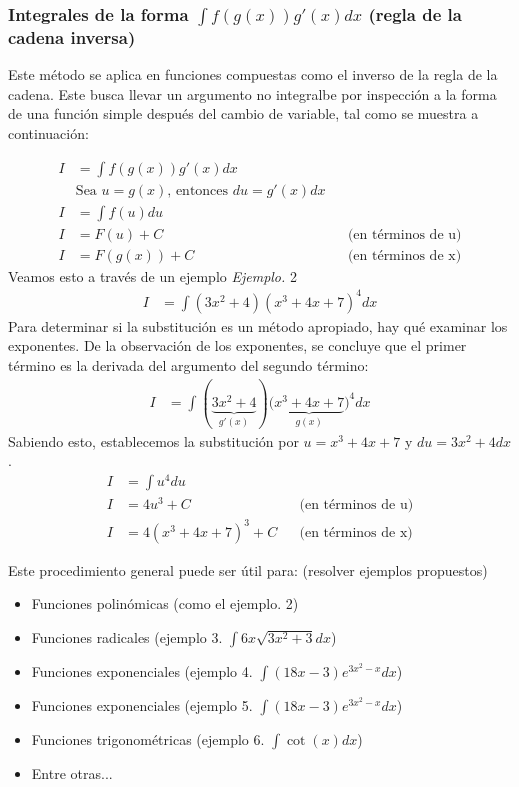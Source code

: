 \documentclass[spanish,12pt]{article}
\begin{document}
\subsubsection{Integrales de la forma $\int f(g(x))g'(x)dx$ (regla de la cadena inversa)} 

Este método se aplica en funciones compuestas como el inverso de la regla de la cadena. Este busca llevar un argumento no integralbe por inspección a la forma de una función simple después del cambio de variable, tal como se muestra a continuación:

\begin{align*}
    I&=\int f(g(x))g'(x)dx\\
    &\text{Sea }u=g(x)\text{, entonces } du=g'(x)dx\\
    I&=\int f(u)du\\
    I&=F(u)+C && \text{(en términos de u)}\\
    I&=F(g(x))+C && \text{(en términos de x)}
\end{align*}
Veamos esto a través de un ejemplo
\textit{Ejemplo.} 2
\begin{align*}
    I&=\int (3x^2+4)(x^3+4x+7)^4dx
\end{align*}
Para determinar si la substitución es un método apropiado, hay qué examinar los exponentes. De la observación de los exponentes, se concluye que el primer término es la derivada del argumento del segundo término:
\begin{align*}
    I&=\int (\underbrace{3x^2+4}_{g'(x)})({\underbrace{x^3+4x+7}_{g(x)})}^4dx
\end{align*}
Sabiendo esto, establecemos la substitución por $u=x^3+4x+7$ y $du=3x^2+4dx$.
\begin{align*}
    I&=\int u^4du\\
    I&=4u^3+C && \text{(en términos de u)}\\
    I&=4(x^3+4x+7)^3+C && \text{(en términos de x)}
\end{align*}

Este procedimiento general puede ser útil para: (resolver ejemplos propuestos)
\begin{itemize}
    \item Funciones polinómicas (como el ejemplo. 2)
    \item Funciones radicales (ejemplo 3. $\int 6x\sqrt{3x^2+3}dx$)
    \item Funciones exponenciales (ejemplo 4. $\int (18x-3)e^{3x^2-x}dx$)
    \item Funciones exponenciales (ejemplo 5. $\int (18x-3)e^{3x^2-x}dx$)
    \item Funciones trigonométricas (ejemplo 6. $\int \cot(x)dx$)
    \item Entre otras...
\end{itemize}
\end{document}

